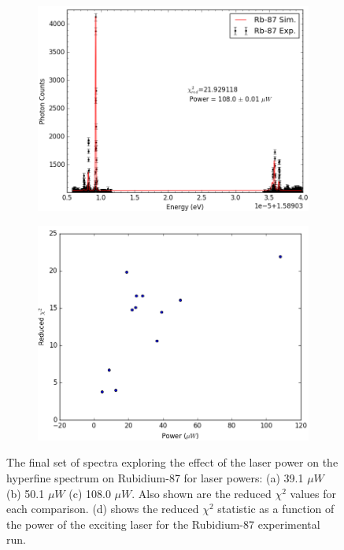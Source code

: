 \begin{figure}[h]
    \begin{subfigure}[b]{0.49\textwidth}
        \includegraphics[width=\textwidth]{Graphics/117_118.png}
        \caption{}
        \label{}
    \end{subfigure}
    \begin{subfigure}[b]{0.49\textwidth}
        \includegraphics[width=\textwidth]{Graphics/chi-v-power.png}
        \caption{}
        \label{chi_vs_power}
    \end{subfigure}
    \caption[The final set of spectra exploring the effect of the laser power on the hyperfine spectrum on Rubidium-87.]{\small The final set of spectra exploring the effect of the laser power on the hyperfine spectrum on Rubidium-87 for laser powers: (a) 39.1 $\mu W$ (b) 50.1 $\mu W$ (c) 108.0 $\mu W$. Also shown are the reduced $\chi^2$ values for each comparison. (d) shows the reduced $\chi^2$ statistic as a function of the power of the exciting laser for the Rubidium-87 experimental run.}
\label{power39-108}
\end{figure}
